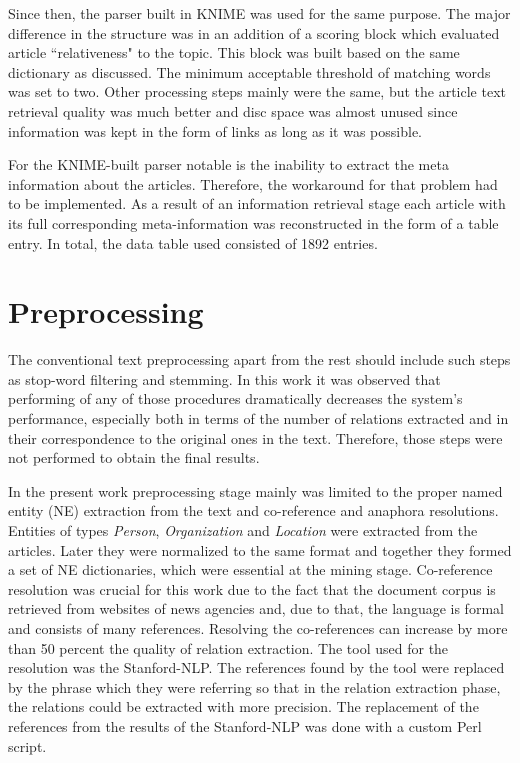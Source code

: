 \documentclass[]{article}
\begin{document}
Since then, the parser built in KNIME was used for the same purpose. The major difference in the structure was in an addition of a scoring block which evaluated article ``relativeness" to the topic. This block was built based on the same dictionary as discussed. The minimum acceptable threshold of matching words was set to two. Other processing steps mainly were the same, but the article text retrieval quality was much better and disc space was almost unused since information was kept in the form of links as long as it was possible. 

For the KNIME-built parser notable is the inability to extract the meta information about the articles. Therefore, the workaround for that problem had to be implemented. As a result of an information retrieval stage each article with its full corresponding meta-information was reconstructed in the form of a table entry. In total, the data table used consisted of 1892 entries.
%
\section{Preprocessing}
%
The conventional text preprocessing apart from the rest should include such steps as stop-word filtering and stemming. In this work it was observed that performing of any of those procedures dramatically decreases the system's performance, especially both in terms of the number of relations extracted and in their correspondence to the original ones in the text. Therefore, those steps were not performed to obtain the final results.

In the present work preprocessing stage mainly was limited to the proper named entity (NE) extraction from the text and co-reference and anaphora resolutions. Entities of types \textit{Person}, \textit{Organization} and \textit{Location} were extracted from the articles. Later they were normalized to the same format and together they formed a set of NE dictionaries, which were essential at the mining stage. Co-reference resolution was crucial for this work due to the fact that the document corpus is retrieved from websites of news agencies and, due to that, the language is formal and consists of many references. Resolving the co-references can increase by more than 50 percent the quality of relation extraction. The tool used for the resolution was the Stanford-NLP. The references found by the tool were replaced by the phrase which they were referring so that in the relation extraction phase, the relations could be extracted with more precision. The replacement of the references from the results of the Stanford-NLP was done with a custom Perl script.
%
\end{document}
